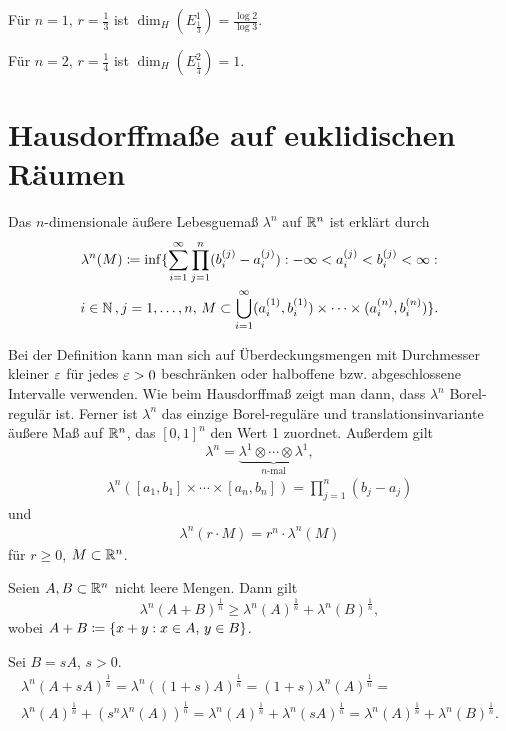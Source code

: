 \documentclass[a4paper,twoside,DIV15,BCOR12mm]{scrbook}
\begin{document}
\begin{beispiele}
\item Für $n=1$, $r=\frac13$ ist $\dim_H(E_{\frac13}^1) = \frac{\log 2}{\log 3}$.
\item Für $n=2$, $r=\frac14$ ist $\dim_H(E_{\frac14}^2) = 1$.
\end{beispiele}

\section{Hausdorffmaße auf euklidischen Räumen}

\begin{definition}
Das $n$-dimensionale äußere Lebesguemaß $\lambda^n$ auf $\mathbb{R}^n$ ist erklärt durch
\begin{multline*}
\lambda^n(M) \da \inf\{\sum_{i=1}^\infty \prod_{j=1}^n (b_i^{(j)} - a_i^{(j)}) : -\infty < a_i^{(j)} < b_i^{(j)} < \infty : \\ i\in\MdN\,,j=1,\ldots,n,\,
M\subset \bigcup_{i=1}^\infty (a_i^{(1)}, b_i^{(1)})\times \cdots \times (a_i^{(n)},b_i^{(n)})\}.
\end{multline*}
\end{definition}

Bei der Definition kann man sich auf Überdeckungsmengen mit Durchmesser kleiner $\varepsilon$ für jedes $\varepsilon>0$ beschränken oder halboffene bzw. abgeschlossene Intervalle verwenden. Wie beim Hausdorffmaß zeigt man dann, dass $\lambda^n$ Borel-regulär ist. Ferner ist $\lambda^n$ das einzige Borel-reguläre und translationsinvariante äußere Maß auf $\mathbb{R}^n$, das $[0,1]^n$ den Wert 1 zuordnet. Außerdem gilt
\[
\lambda^n = \underbrace{\lambda^1\otimes \cdots \otimes \lambda^1}_{\text{$n$-mal}},
\]
\begin{align*}
\lambda^n([a_1,b_1]\times \cdots \times [a_n,b_n]) = \prod_{j=1}^n (b_j-a_j)
\end{align*}
und
\begin{align*}
\lambda^n(r\cdot M) = r^n\cdot \lambda^n(M)
\end{align*}
für $r\ge 0$, $M\subset \mathbb{R}^n$.

\begin{satz}
\label{satz:2.26}
Seien $A,B\subset \mathbb{R}^n$ nicht leere Mengen. Dann gilt \[
\lambda^n(A+B)^{\frac1n} \ge \lambda^n(A)^{\frac1n} + \lambda^n(B)^{\frac1n},
\]
wobei $A+B \da \{x+y : x\in A,\, y\in B\}$.
\end{satz}

\begin{beispiel}
Sei $B= sA$, $s>0$.
\begin{multline*}
\lambda^n(A + sA)^{\frac1n} = \lambda^n( (1+s)A )^{\frac1n} = (1+s)\lambda^n(A)^{\frac1n} =
\\
\lambda^n(A)^{\frac1n} + (s^n\lambda^n(A))^{\frac1n} = \lambda^n(A)^{\frac1n} + \lambda^n(sA)^{\frac1n} = \lambda^n(A)^{\frac1n} + \lambda^n(B)^{\frac1n}.
\end{multline*}
\end{beispiel}
\end{document}
